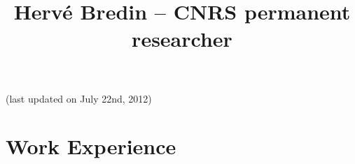 \documentclass{simplecv}
\begin{document}
\pagestyle{empty} 



\title{Herv\'{e} Bredin -- CNRS permanent researcher}

\maketitle

\vspace{-1cm}
\begin{center}
(last updated on July 22nd, 2012)
\end{center}

\section{Work Experience}
\end{document}
